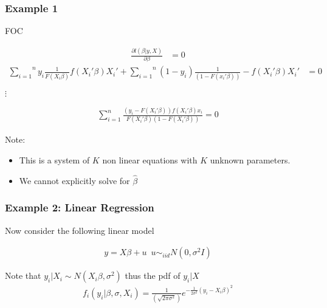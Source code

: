 \documentclass[
  shownotes,
  xcolor={svgnames},
  hyperref={colorlinks,citecolor=DarkBlue,linkcolor=DarkRed,urlcolor=DarkBlue}
  ]{beamer}
\begin{document}
\begin{frame}[fragile]
\frametitle{Example 1}
FOC

\begin{align}
\frac{\partial l(\beta|y,X)}{\partial\beta}&=0 
\end{align}
\begin{align}
\overset{n}{\underset{i=1}{\sum}}y_{i}\frac{1}{F(X_{i}\beta)}f(X_{i}'\beta)X_{i}'+\overset{n}{\underset{i=1}{\sum}}\left(1-y_{i}\right)\frac{1}{\left(1-F(x_{i}'\beta)\right)}-f(X_{i}'\beta)X_{i}'&=0
\end{align}

$\vdots$


\begin{align}
\sum_{i=1}^n\frac{(y_i-F(X_{i}'\beta))f(X_{i}'\beta)x_i}{F(X_{i}'\beta)(1-F(X_{i}'\beta))}=0
\end{align}

Note:
\begin{itemize}
  \item This is a system of $K$ non linear equations with $K$ unknown parameters. 
  \item We cannot explicitly solve for $\hat \beta$
\end{itemize}

\end{frame}

\begin{frame}[fragile]
\frametitle{Example 2: Linear Regression}

Now consider the following linear model 
\medskip

\begin{align}
y=X\beta+u\,\,\,u\sim_{iid} N(0,\sigma^2I)
\end{align}

\medskip
Note that $y_i|X_i\sim N(X_i\beta,\sigma^2)$ thus the pdf of $y_i|X$
\medskip
\begin{align}
f_i(y_i|\beta,\sigma,X_i)=\frac{1}{(\sqrt{2\pi\sigma^2})}e^{-\frac{1}{2\sigma^2}(y_i-X_i\beta)^2}
\end{align}


\end{frame}
\end{document}
